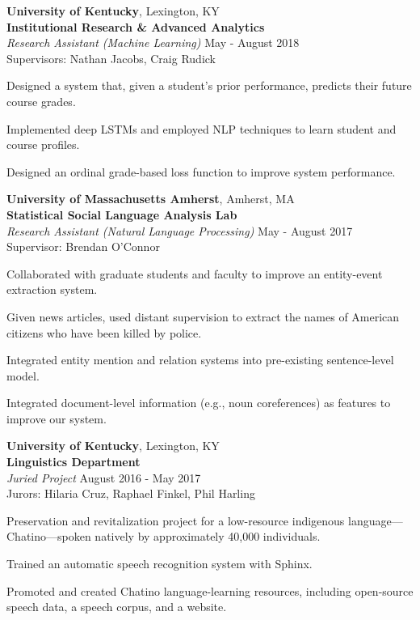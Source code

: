 \documentclass[10pt]{article}
\newcommand{\halfblankline}{\quad\vspace{-0.5\baselineskip}\pagebreak[3]}
\begin{document}
	{\textbf{University of Kentucky}},
	Lexington, KY\\
	\textbf{Institutional Research \& Advanced Analytics}\\
		\textit{Research Assistant (Machine Learning)}
		\hfill May - August 2018\\
		Supervisors: Nathan Jacobs, Craig Rudick
		\begin{innerlist}
			\item Designed a system that, given a student's prior performance,
			predicts their future course grades.
			\item Implemented deep LSTMs and employed NLP techniques to learn student and
			course profiles.
			\item Designed an ordinal grade-based loss function to improve system performance.
		\end{innerlist}

	\halfblankline

	{\textbf{University of Massachusetts Amherst}},
	Amherst, MA\\
	\textbf{Statistical Social Language Analysis Lab}\\
		\textit{Research Assistant (Natural Language Processing)}%
		\hfill May - August 2017\\
		Supervisor: Brendan O'Connor
		\begin{innerlist}
			\item Collaborated with graduate students and faculty to improve an entity-event extraction system.
			\item Given news articles, used distant supervision to extract the names of American citizens who have been killed by police.
			\item Integrated entity mention and relation systems into pre-existing sentence-level model.
			\item Integrated document-level information (e.g., noun coreferences) as features to improve our system.
		\end{innerlist}
	
	\halfblankline
	
	{\textbf{University of Kentucky}},
	Lexington, KY\\
	\textbf{Linguistics Department}\\
		\textit{Juried Project}%
		\hfill August 2016 - May 2017\\
		Jurors: Hilaria Cruz, Raphael Finkel, Phil Harling
		\begin{innerlist}
			\item Preservation and revitalization project for a low-resource indigenous language---Chatino---spoken natively by approximately 40,000 individuals.
			\item Trained an automatic speech recognition system with Sphinx.
			\item Promoted and created Chatino language-learning resources, including open-source speech data, a speech corpus, and a website.
		\end{innerlist}
	
\end{document}
